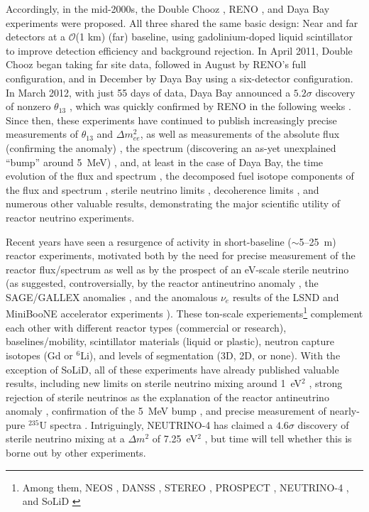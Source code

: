 \documentclass[../thesis.tex]{subfiles}
\begin{document}
Accordingly, in the mid-2000s, the Double Chooz \cite{Ardellier:2006mn}, RENO \cite{Ahn:2010vy}, and Daya Bay \cite{Guo:2007ug} experiments were proposed. All three shared the same basic design: Near and far detectors at a $\mathcal{O}$(1 km) (far) baseline, using gadolinium-doped liquid scintillator to improve detection efficiency and background rejection. In April 2011, Double Chooz began taking far site data, followed in August by RENO's full configuration, and in December by Daya Bay using a six-detector configuration. In March 2012, with just 55 days of data, Daya Bay announced a $5.2\sigma$ discovery of nonzero $\theta_{13}$ \cite{PhysRevLett.108.171803}, which was quickly confirmed by RENO in the following weeks \cite{PhysRevLett.108.191802}. Since then, these experiments have continued to publish increasingly precise measurements of $\theta_{13}$ and $\Delta m^2_{ee}$, as well as measurements of the absolute flux (confirming the anomaly) \cite{PhysRevD.100.052004,Atif:2020eyo,DoubleChooz2020}, the spectrum (discovering an as-yet unexplained ``bump'' around 5~MeV) \cite{PhysRevD.100.052004,Atif:2020eyo,DoubleChooz2020}, and, at least in the case of Daya Bay, the time evolution of the flux and spectrum \cite{PhysRevLett.118.251801}, the decomposed fuel isotope components of the flux and spectrum \cite{PhysRevLett.123.111801}, sterile neutrino limits \cite{PhysRevLett.117.151801}, decoherence limits \cite{DayaBayWavePacket}, and numerous other valuable results, demonstrating the major scientific utility of reactor neutrino experiments.

Recent years have seen a resurgence of activity in short-baseline ($\sim$5--25~m) reactor experiments, motivated both by the need for precise measurement of the reactor flux/spectrum as well as by the prospect of an eV-scale sterile neutrino (as suggested, controversially, by the reactor antineutrino anomaly \cite{PhysRevD.83.073006}, the SAGE/GALLEX anomalies \cite{PhysRevC.80.015807,KAETHER201047}, and the anomalous $\nu_e$ results of the LSND and MiniBooNE accelerator experiments \cite{PhysRevD.64.112007,PhysRevLett.121.221801}). These ton-scale experiements\footnote{Among them, NEOS \cite{Ko:2019cip}, DANSS \cite{Alekseev_2016}, STEREO \cite{Allemandou_2018}, PROSPECT \cite{ASHENFELTER2019287}, NEUTRINO-4 \cite{Serebrov:2020kmd}, and SoLiD \cite{Abreu_2021}} complement each other with different reactor types (commercial or research), baselines/mobility, scintillator materials (liquid or plastic), neutron capture isotopes (Gd or $^6$Li), and levels of segmentation (3D, 2D, or none). With the exception of SoLiD, all of these experiments have already published valuable results, including new limits on sterile neutrino mixing around 1~eV$^2$ \cite{PhysRevLett.118.121802,Svirida:2019kbq,PhysRevD.102.052002,PhysRevD.103.032001}, strong rejection of sterile neutrinos as the explanation of the reactor antineutrino anomaly \cite{PhysRevD.102.052002,PhysRevD.103.032001}, confirmation of the 5~MeV bump \cite{PhysRevLett.118.121802}, and precise measurement of nearly-pure $^{235}$U spectra \cite{PhysRevD.103.032001}. Intriguingly, NEUTRINO-4 has claimed a $4.6\sigma$ discovery of sterile neutrino mixing at a $\Delta m^2$ of 7.25~eV$^2$ \cite{Serebrov_2020}, but time will tell whether this is borne out by other experiments.
\end{document}
